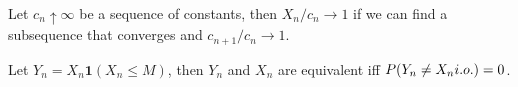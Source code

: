 \begin{method}
    Let \(c_{n} \uparrow \infty\) be a sequence of constants, then \(X_{n} /c_{n} \to 1\) if we can find a subsequence that converges and \(c_{n+1}/c_{n} \to 1\).
\end{method}

\begin{method}[Truncating]
    Let \(Y_{n} = X_{n} \mathbf{1}(X_{n} \leq M)\), then \(Y_{n}\) and \(X_{n}\) are equivalent iff \(P\pqty{Y_{n} \neq X_{n} i.o.} = 0\). 
\end{method}

